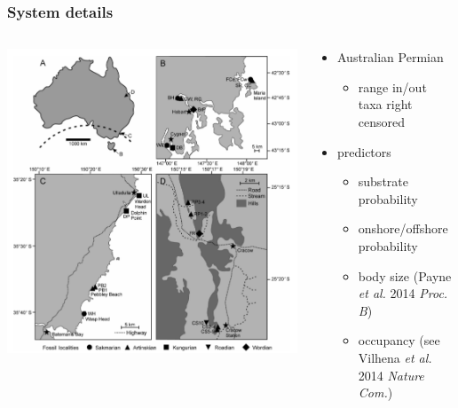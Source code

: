\documentclass{beamer}
\begin{document}
\begin{frame}
  \frametitle{System details}
  \begin{columns}
    \begin{column}{0.5\textwidth}
      \includegraphics[height = 0.8\textheight, width = \textwidth, keepaspectratio = true]{figure/australia}

      \tiny{}
    \end{column}
    \begin{column}{0.5\textwidth}
      \begin{itemize}
        \item Australian Permian
          \begin{itemize}
            \item range in/out taxa right censored
          \end{itemize}
        \item predictors 
          \begin{itemize}
            \item substrate probability 
            \item onshore/offshore probability
            \item body size (Payne \textit{et al.} 2014 \textit{Proc. B})
            \item occupancy (see Vilhena \textit{et al.} 2014 \textit{Nature Com.})
          \end{itemize}
      \end{itemize}
    \end{column}
  \end{columns}
\end{frame}
\end{document}
